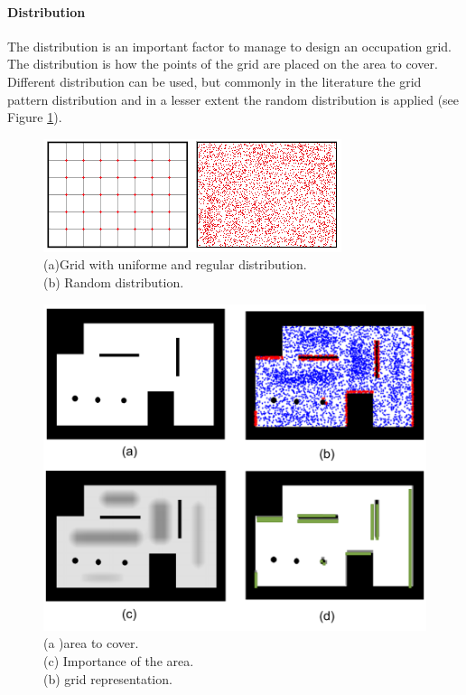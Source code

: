 \paragraph{ Distribution}
The distribution is an important factor to manage to design an occupation grid. The distribution is how the  points of the grid are placed on the area to cover.
Different distribution can be used, but commonly in the literature the grid pattern distribution and in a lesser extent the random distribution is applied (see Figure \ref{fig:GridVsRand}). \\
\begin{figure}[t!]
\begin{center}
   \includegraphics[width=\linewidth]{img/GridVsRand.png}
  \caption{ (a)Grid with uniforme and regular distribution.\\   
(b) Random distribution.\\  
}\label{fig:GridVsRand}
  \endminipage\hfill
  \end{center}
\end{figure}
\begin{figure}[t!]
\begin{center}
   \includegraphics[width=\linewidth]{img/randomGridRef171.png}
  \caption{ (a )area  to cover.\\   
(c) Importance of the area.\\  
(b) grid representation.}\label{fig:randomGridRef171}
  \endminipage\hfill
  \end{center}
\end{figure}

